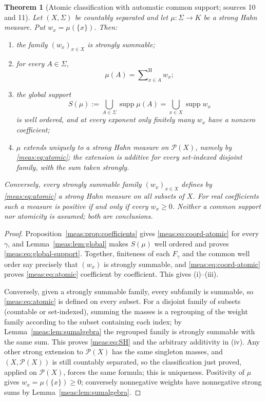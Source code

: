 \documentclass[11pt]{article}
\numberwithin{equation}{section}
\newtheorem{theorem}{Theorem}[section]
\theoremstyle{definition}
\theoremstyle{remark}
\newcommand{\Pset}{\mathcal P}
\newcommand{\supp}{\operatorname{supp}}
\newcommand{\hsum}{\mathop{\sum}\nolimits^{\mathrm H}}
\begin{document}
\begin{theorem}[Atomic classification with automatic common support;
sources 10 and 11]\label{meas:thm:atomic}
Let $(X,\Sigma)$ be countably separated and let $\mu:\Sigma\to K$ be a strong
Hahn measure. Put $w_x=\mu(\{x\})$. Then:
\begin{enumerate}[label=(\roman*)]
\item the family $(w_x)_{x\in X}$ is strongly summable;
\item for every $A\in\Sigma$,
\begin{equation}\label{meas:eq:atomic}
 \mu(A)=\hsum_{x\in A}w_x;
\end{equation}
\item the global support
\begin{equation}\label{meas:eq:global-support}
 S(\mu):=\bigcup_{A\in\Sigma}\supp\mu(A)=\bigcup_{x\in X}\supp w_x
\end{equation}
is well ordered, and at every exponent only finitely many $w_x$ have a nonzero
coefficient;
\item $\mu$ extends uniquely to a strong Hahn measure on $\Pset(X)$, namely by
\eqref{meas:eq:atomic}; the extension is additive for every set-indexed
disjoint family, with the sum taken strongly.
\end{enumerate}
Conversely, every strongly summable family $(w_x)_{x\in X}$ defines by
\eqref{meas:eq:atomic} a strong Hahn measure on \emph{all} subsets of $X$. For
real coefficients such a measure is positive if and only if every $w_x\ge0$.
Neither a common support nor atomicity is assumed; both are conclusions.
\end{theorem}
\begin{proof}
Proposition~\ref{meas:prop:coefficients} gives \eqref{meas:eq:coord-atomic} for
every $\gamma$, and Lemma~\ref{meas:lem:global} makes $S(\mu)$ well ordered and
proves \eqref{meas:eq:global-support}. Together, finiteness of each $F_\gamma$
and the common well order say precisely that $(w_x)$ is strongly summable, and
\eqref{meas:eq:coord-atomic} proves \eqref{meas:eq:atomic} coefficient by
coefficient. This gives (i)--(iii).

Conversely, given a strongly summable family, every subfamily is summable, so
\eqref{meas:eq:atomic} is defined on every subset. For a disjoint family of
subsets (countable or set-indexed), summing the masses is a regrouping of the
weight family according to the subset containing each index; by
Lemma~\ref{meas:lem:sumalgebra} the regrouped family is strongly summable with
the same sum. This proves \eqref{meas:eq:SH} and the arbitrary additivity in
(iv). Any other strong extension to $\Pset(X)$ has the same singleton masses,
and $(X,\Pset(X))$ is still countably separated, so the classification just
proved, applied on $\Pset(X)$, forces the same formula; this is uniqueness.
Positivity of $\mu$ gives $w_x=\mu(\{x\})\ge0$; conversely nonnegative weights
have nonnegative strong sums by Lemma~\ref{meas:lem:sumalgebra}.
\end{proof}
\end{document}
